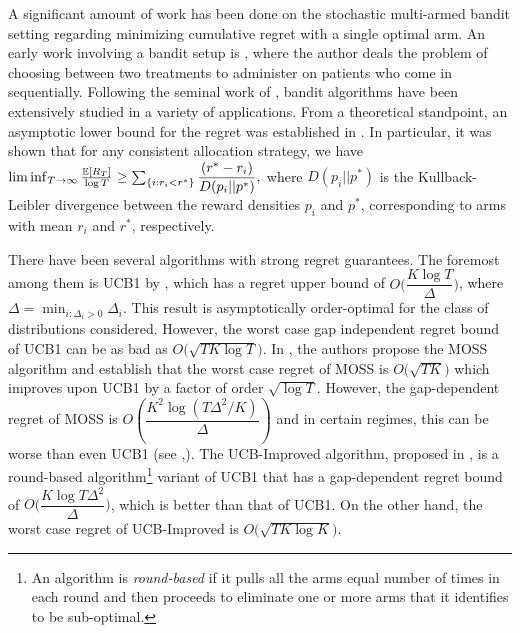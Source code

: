 	A significant amount of work has been done on the stochastic multi-armed bandit setting regarding minimizing cumulative regret with a single optimal arm. An early work involving a bandit setup is \cite{thompson1933likelihood}, where the author deals the problem of choosing between two treatments to administer on patients who come in sequentially. Following the seminal work of  \cite{robbins1952some}, bandit algorithms have been extensively studied in a variety of applications. 
From a theoretical standpoint, an asymptotic lower bound for the regret was established in \cite{lai1985asymptotically}. In particular, it was shown that for any consistent allocation strategy, we have
$\liminf_{T \to \infty}\frac{\mathbb{E}[R_{T}]}{\log T}\geq\sum_{\{i:r_{i}<r^{*}\}}\dfrac{(r^{*}-r_{i})}{D(p_{i}||p^{*})},$
where $D(p_{i}||p^{*})$ is the Kullback-Leibler divergence between the reward densities $p_{i}$ and $p^{*}$, corresponding to arms with mean $r_{i}$ and $r^{*}$, respectively.

	There have been several algorithms with strong regret guarantees. The foremost among them is UCB1 by  \cite{auer2002finite}, which has a regret upper bound of $O\bigg(\dfrac{K\log T}{\Delta}\bigg)$, where $\Delta = \min_{i:\Delta_i>0} \Delta_i$. This result is asymptotically order-optimal for the class of distributions considered. However, the worst case gap independent regret bound of UCB1  can be as bad as $O \bigg(\sqrt{TK\log T}\bigg)$.  In \cite{audibert2009minimax}, the authors propose the MOSS algorithm and establish that the worst case regret of MOSS is $O\bigg(\sqrt{TK}\bigg)$ which improves upon UCB1 by a factor of order $\sqrt{\log T}$. However, the gap-dependent regret of MOSS is  $O\left(\dfrac{K^{2}\log\left(T\Delta^{2}/K\right)}{\Delta}\right)$ and in certain regimes, this can be worse than even UCB1 (see \cite{audibert2009minimax},\cite{lattimore2015optimally}). The UCB-Improved algorithm, proposed in \cite{auer2010ucb}, is a round-based algorithm\footnote{An algorithm is \textit{round-based} if it pulls all the arms equal number of times in each round and then proceeds to eliminate one or more arms that it identifies to be sub-optimal.} variant of UCB1 that 
has a gap-dependent regret bound of $O\bigg(\dfrac{K\log T\Delta^{2}}{\Delta}\bigg)$, which is better than that of UCB1. On the other hand, the worst case regret of UCB-Improved is $O\bigg(\sqrt{TK\log K}\bigg)$. 

